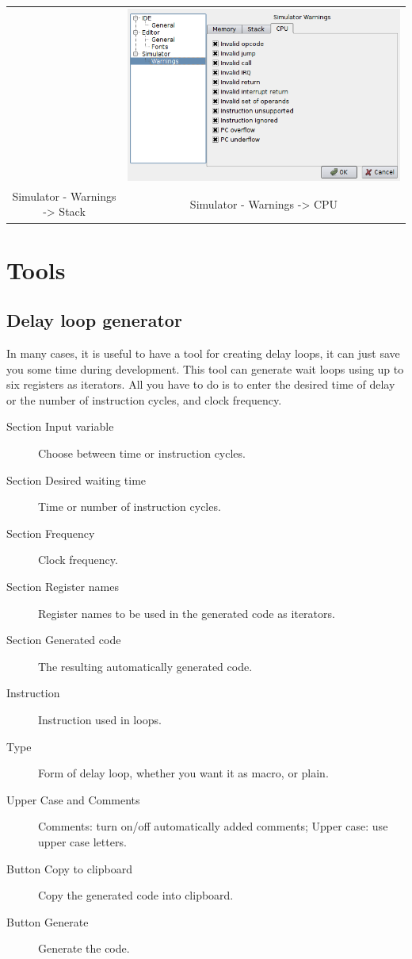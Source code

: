 \begin{table}[h!]
\begin{tabular}{cc}
                    &
                \includegraphics[width=.4\textwidth]{img/interface6.png}
                    \\
                Simulator - Warnings -> Stack & Simulator - Warnings -> CPU
            \end{tabular}
        \end{table}

\clearpage
\section{Tools}
    \subsection{Delay loop generator}
        In many cases, it is useful to have a tool for creating delay loops, it can just save you some time during         development. This tool can generate wait loops using up to six registers as iterators. All you have to do is to enter the desired time of delay or the number of instruction cycles, and clock frequency.

        \begin{description}
            \item[Section Input variable] Choose between time or instruction cycles.
            \item[Section Desired waiting time] Time or number of instruction cycles.
            \item[Section Frequency] Clock frequency.
            \item[Section Register names] Register names to be used in the generated code as iterators.
            \item[Section Generated code] The resulting automatically generated code.
            \item[Instruction] Instruction used in loops.
            \item[Type] Form of delay loop, whether you want it as macro, or plain.
            \item[Upper Case and Comments] Comments: turn on/off automatically added comments; Upper case: use upper case letters.
            \item[Button Copy to clipboard] Copy the generated code into clipboard.
            \item[Button Generate] Generate the code.
        \end{description}

